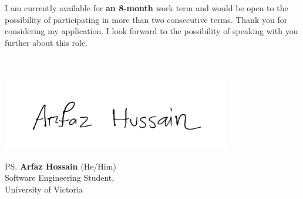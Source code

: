 \documentclass[a4paper, 12pt, oneside]{letter}
\newcommand{\Terms}{an 8-month}
\begin{document}
I am currently available for \textbf{\Terms} work term and would be open to the possibility of participating in more than two consecutive terms. Thank you for considering my application. I look forward to the possibility of speaking with you further about this role. \\\\\\
\vspace{10pt}
\vspace{-25pt}\begin{flushleft}
\hspace*{-1cm}\includegraphics[width=10cm]{../../9.2 PreProcessed/0 Resources/signature.png}\vspace{-1cm}
\end{flushleft}
\vspace{-10pt}\ps{\textbf{Arfaz Hossain} (He/Him)\\
Software Engineering Student,\\
University of Victoria} 
\end{document}
